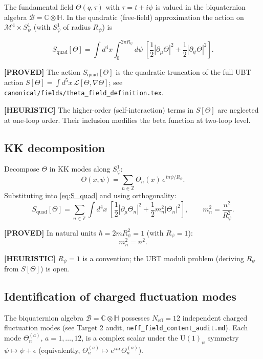 \documentclass[11pt,a4paper]{article}
\newcommand{\proved}[1]{\textbf{[PROVED]} #1}
\newcommand{\heuristic}[1]{\textbf{[HEURISTIC]} #1}
\begin{document}
The fundamental field $\Theta(q,\tau)$ with $\tau = t + i\psi$ is valued in the
biquaternion algebra $\mathcal{B} = \mathbb{C}\otimes\mathbb{H}$.  In the
quadratic (free-field) approximation the action on $\mathcal{M}^4 \times S^1_\psi$
(with $S^1_\psi$ of radius $R_\psi$) is

\begin{equation}
  \label{eq:S_quad}
  S_\mathrm{quad}[\Theta]
  = \int d^4x \int_0^{2\pi R_\psi} d\psi\;
    \left[\frac{1}{2}|\partial_\mu \Theta|^2
         + \frac{1}{2}|\partial_\psi \Theta|^2\right].
\end{equation}

\proved{The action $S_\mathrm{quad}[\Theta]$ is the quadratic truncation of the full
UBT action $S[\Theta] = \int d^5x\,\mathscr{L}[\Theta,\nabla\Theta]$; see
\texttt{canonical/fields/theta\_field\_definition.tex}.}

\heuristic{The higher-order (self-interaction) terms in $S[\Theta]$ are neglected at
one-loop order.  Their inclusion modifies the beta function at two-loop level.}

\subsection{KK decomposition}

Decompose $\Theta$ in KK modes along $S^1_\psi$:
\begin{equation}
  \label{eq:KK_decomp}
  \Theta(x,\psi) = \sum_{n\in\mathbb{Z}} \Theta_n(x)\,e^{in\psi/R_\psi}.
\end{equation}
Substituting into \eqref{eq:S_quad} and using orthogonality:
\begin{equation}
  \label{eq:S_KK}
  S_\mathrm{quad}[\Theta]
  = \sum_{n\in\mathbb{Z}} \int d^4x\;
    \left[\frac{1}{2}|\partial_\mu \Theta_n|^2
         + \frac{1}{2} m_n^2|\Theta_n|^2\right],
  \qquad
  m_n^2 = \frac{n^2}{R_\psi^2}.
\end{equation}

\proved{In natural units $\hbar = 2mR_\psi^2 = 1$ (with $R_\psi = 1$):
\[
  m_n^2 = n^2.
\]}

\heuristic{$R_\psi = 1$ is a convention; the UBT moduli problem (deriving $R_\psi$
from $S[\Theta]$) is open.}

\subsection{Identification of charged fluctuation modes}

The biquaternion algebra $\mathcal{B} = \mathbb{C}\otimes\mathbb{H}$ possesses
$N_\mathrm{eff} = 12$ independent charged fluctuation modes (see Target 2 audit,
\texttt{neff\_field\_content\_audit.md}).  Each mode $\Theta_n^{(a)}$, $a = 1,\ldots,12$,
is a complex scalar under the $\mathrm{U}(1)_\psi$ symmetry $\psi \mapsto \psi + \epsilon$
(equivalently, $\Theta_n^{(a)} \mapsto e^{in\epsilon} \Theta_n^{(a)}$).
\end{document}
